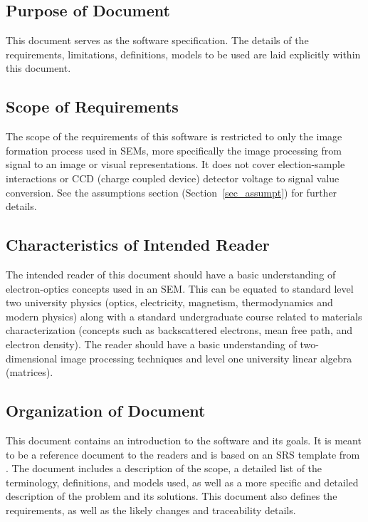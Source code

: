 \documentclass[12pt]{article}
\begin{document}
\subsection{Purpose of Document}

This document serves as the software specification. The details of the 
requirements, limitations, definitions, models to be used are laid explicitly 
within this document.

\subsection{Scope of Requirements} 

The scope of the requirements of this software is restricted to only the image 
formation process used in SEMs, more specifically the image processing from 
signal to an image or visual representations. It does not cover election-sample 
interactions or CCD (charge coupled device) detector voltage to signal value 
conversion. See the assumptions section (Section~\ref{sec_assumpt}) for further 
details.

\subsection{Characteristics of Intended Reader} \label{sec_IntendedReader}

The intended reader of this document should have a basic understanding of 
electron-optics concepts used in an SEM. This can be equated to standard level 
two university physics (optics, electricity, magnetism, thermodynamics and 
modern physics) along with a standard undergraduate course related to materials 
characterization (concepts such as backscattered electrons, mean free path, and 
electron density). The reader should have a basic understanding of two-dimensional 
image processing techniques and level one university linear algebra (matrices).

\subsection{Organization of Document}

This document contains an introduction to the software and its goals. It is 
meant to be a reference document to the readers and is based on an SRS template from \citet{SmithAndLai2005, SmithEtAl2007}. The document includes a 
description of the scope, a detailed list of the terminology, definitions, and 
models used, as well as a more specific and detailed description of the problem 
and its solutions. This document also defines the requirements, as well as the  
likely changes and traceability details.
\end{document}
